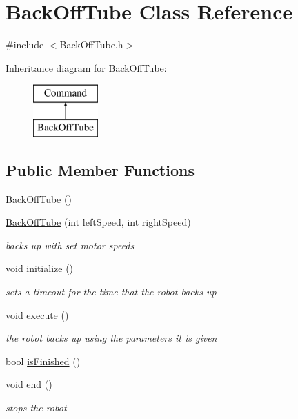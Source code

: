 \hypertarget{classBackOffTube}{\section{Back\-Off\-Tube Class Reference}
\label{classBackOffTube}
}


{\ttfamily \#include $<$Back\-Off\-Tube.\-h$>$}

Inheritance diagram for Back\-Off\-Tube\-:\begin{figure}[H]
\begin{center}
\leavevmode
\includegraphics[height=2.000000cm]{classBackOffTube}
\end{center}
\end{figure}
\subsection*{Public Member Functions}
\begin{DoxyCompactItemize}
\item 
\hyperlink{classBackOffTube_ab8fb886043a6df04258ac22415b543dd}{Back\-Off\-Tube} ()
\item 
\hyperlink{classBackOffTube_a6fedeb5bfc92b531a300ce2d95a1a3bb}{Back\-Off\-Tube} (int left\-Speed, int right\-Speed)
\begin{DoxyCompactList}\small\item\em backs up with set motor speeds \end{DoxyCompactList}\item 
void \hyperlink{classBackOffTube_a16b83364009db3cb58ec6c09458a8741}{initialize} ()
\begin{DoxyCompactList}\small\item\em sets a timeout for the time that the robot backs up \end{DoxyCompactList}\item 
void \hyperlink{classBackOffTube_a9d40125cdd95f7ca2db13a5d48e91a93}{execute} ()
\begin{DoxyCompactList}\small\item\em the robot backs up using the parameters it is given \end{DoxyCompactList}\item 
bool \hyperlink{classBackOffTube_abda2334a9432829830a51195a9cce4e6}{is\-Finished} ()
\item 
void \hyperlink{classBackOffTube_a6753fa3b5148d3b8cc06b8e2f7f02be7}{end} ()
\begin{DoxyCompactList}\small\item\em stops the robot \end{DoxyCompactList}\end{DoxyCompactItemize}
